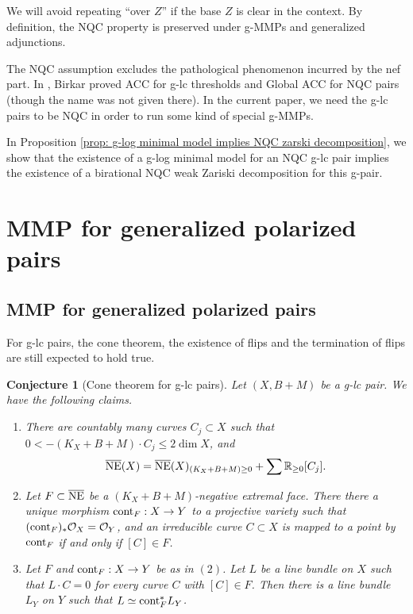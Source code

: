 \documentclass[11pt]{amsart}
\newcommand{\Rr}{\mathbb{R}}
\newcommand{\Oo}{\mathcal{O}}
\newtheorem{conjecture}[theorem]{Conjecture}
\begin{document}
We will avoid repeating ``over $Z$'' if the base $Z$ is clear in the context. By definition, the NQC property is preserved under g-MMPs and generalized adjunctions. 

The NQC assumption excludes the pathological phenomenon incurred  by the nef part. In \cite{BZ16}, Birkar proved ACC for g-lc thresholds and Global ACC for NQC pairs (though the name was not given there). In the current paper, we need the g-lc pairs to be NQC in order to run some kind of special g-MMPs.

In Proposition \ref{prop: g-log minimal model implies NQC zarski decomposition}, we show that the existence of a g-log minimal model for an NQC g-lc pair implies the existence of a birational NQC weak Zariski decomposition for this g-pair. 


\section{MMP for generalized polarized pairs}\label{sec: LMMP}

\subsection{MMP for generalized polarized pairs}\label{subsection: MMP for g-pairs}
For g-lc pairs, the cone theorem, the existence of flips and the termination of flips are still expected to hold true. 
\begin{conjecture}[Cone theorem for g-lc pairs]
	Let $(X,B+M)$ be a g-lc pair. We have the following claims.
	\begin{enumerate}
		\item There are countably many curves $C_j\subset X$ such that $0<-(K_X+B+M)\cdot C_j\le 2\dim X$, and
		$$\overline{\rm NE}(X)=\overline{\rm NE}(X)_{(K_X+B+M)\ge0}+\sum\Rr_{\ge0}[C_j].$$
		\item Let $F\subset \overline{\rm NE}$ be a $(K_X+B+M)$-negative extremal face. There there a unique morphism ${\rm cont}_{F}:X\to Y$ to a projective variety such that  $({\rm cont}_{F})_{*}\Oo_X=\Oo_Y$, and an irreducible curve $C\subset X$ is mapped to a point by ${\rm cont}_{F}$ if and only if $[C]\in F$. 
		\item Let $F$ and ${\rm cont}_{F}:X\to Y$ be as in $(2)$. Let $L$ be a line bundle on $X$ such that $L\cdot C=0$ for every curve $C$ with $[C]\in F$. Then there is a line bundle $L_Y$ on $Y$ such that $L\simeq {\rm cont}_{F}^{*}L_Y$. 
	\end{enumerate}
\end{conjecture}
\end{document}
